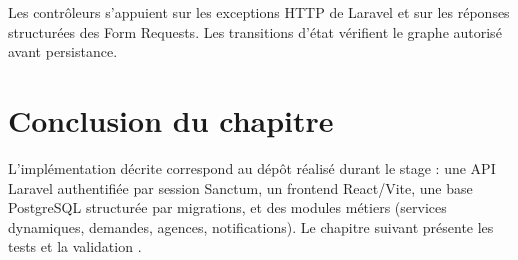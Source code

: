 Les contrôleurs s'appuient sur les exceptions HTTP de Laravel et sur les réponses structurées des Form Requests. Les transitions d'état vérifient le graphe autorisé avant persistance.

\section{Conclusion du chapitre}

L'implémentation décrite correspond au dépôt réalisé durant le stage : une API Laravel authentifiée par session Sanctum, un frontend React/Vite, une base PostgreSQL structurée par migrations, et des modules métiers (services dynamiques, demandes, agences, notifications). Le chapitre suivant présente les tests et la validation \cite{ieee1012,sommerville2016}.
